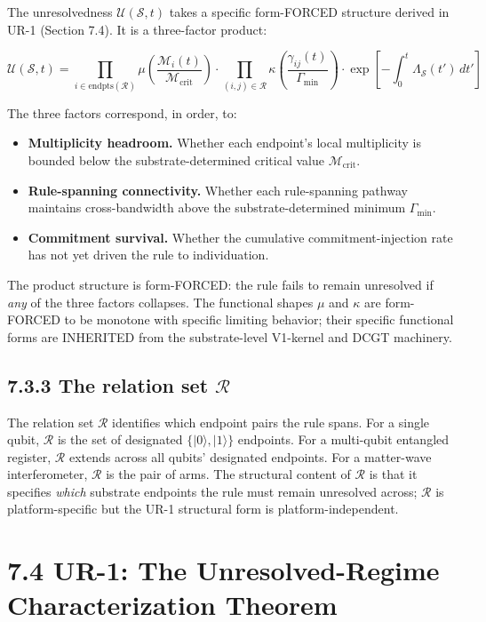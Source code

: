 \documentclass[11pt]{book}
\begin{document}
The unresolvedness $\mathcal{U}(\mathcal{S}, t)$ takes a specific form-FORCED structure derived in UR-1 (Section 7.4). It is a three-factor product:

\[
\mathcal{U}(\mathcal{S}, t) = \prod_{i \in \mathrm{endpts}(\mathcal{R})} \mu\!\left(\frac{\mathcal{M}_i(t)}{\mathcal{M}_\mathrm{crit}}\right) \cdot \prod_{(i,j) \in \mathcal{R}} \kappa\!\left(\frac{\gamma_{ij}(t)}{\Gamma_\mathrm{min}}\right) \cdot \exp\!\left[-\int_0^t \Lambda_\mathcal{S}(t')\,dt'\right]
\]

The three factors correspond, in order, to:

\begin{itemize}
\item \textbf{Multiplicity headroom.} Whether each endpoint's local multiplicity is bounded below the substrate-determined critical value $\mathcal{M}_\mathrm{crit}$.
\item \textbf{Rule-spanning connectivity.} Whether each rule-spanning pathway maintains cross-bandwidth above the substrate-determined minimum $\Gamma_\mathrm{min}$.
\item \textbf{Commitment survival.} Whether the cumulative commitment-injection rate has not yet driven the rule to individuation.
\end{itemize}

The product structure is form-FORCED: the rule fails to remain unresolved if \textit{any} of the three factors collapses. The functional shapes $\mu$ and $\kappa$ are form-FORCED to be monotone with specific limiting behavior; their specific functional forms are INHERITED from the substrate-level V1-kernel and DCGT machinery.

\subsection{7.3.3 The relation set $\mathcal{R}$}

The relation set $\mathcal{R}$ identifies which endpoint pairs the rule spans. For a single qubit, $\mathcal{R}$ is the set of designated $\{|0\rangle, |1\rangle\}$ endpoints. For a multi-qubit entangled register, $\mathcal{R}$ extends across all qubits' designated endpoints. For a matter-wave interferometer, $\mathcal{R}$ is the pair of arms. The structural content of $\mathcal{R}$ is that it specifies \textit{which} substrate endpoints the rule must remain unresolved across; $\mathcal{R}$ is platform-specific but the UR-1 structural form is platform-independent.

\section{7.4 UR-1: The Unresolved-Regime Characterization Theorem}
\end{document}
